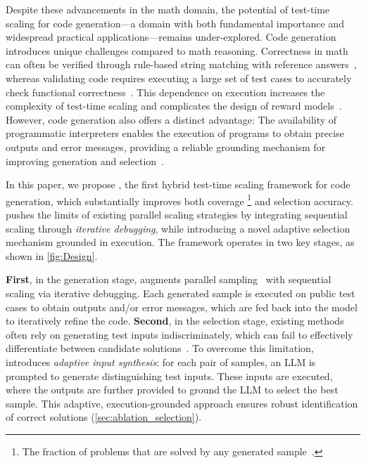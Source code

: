 Despite these advancements in the math domain, the potential of test-time scaling for code generation---a domain with both fundamental importance and widespread practical applications---remains under-explored. Code generation introduces unique challenges compared to math reasoning. Correctness in math can often be verified through rule-based string matching with reference answers~\citep{guo2025deepseek, AceCoder}, whereas validating code requires executing a large set of test cases to accurately check functional correctness~\citep{liu2023your}. This dependence on execution increases the complexity of test-time scaling and complicates the design of reward models~\citep{AceCoder}. However, code generation also offers a distinct advantage: The availability of programmatic interpreters enables the execution of programs to obtain precise outputs and error messages, providing a reliable grounding mechanism for improving generation and selection~\citep{chen2023teaching, li2022competition}.



In this paper, we propose \frameworkname, the first hybrid test-time scaling framework for code generation, which substantially improves both coverage \footnote{The fraction of problems that are solved by any generated
sample~\citep{brown2024large}.} and selection accuracy. \frameworkname pushes the limits of existing parallel scaling strategies by integrating sequential scaling through \emph{iterative debugging}, while introducing a novel adaptive selection mechanism grounded in execution. The framework operates in two key stages, as shown in \cref{fig:Design}.

\textbf{First}, in the generation stage, \frameworkname augments parallel sampling~\citep{brown2024large, li2022competition} with sequential scaling via iterative debugging. Each generated sample is executed on public test cases to obtain outputs and/or error messages, which are fed back into the model to iteratively refine the code. 
\textbf{Second}, in the selection stage, existing methods often rely on generating test inputs indiscriminately, which can fail to effectively differentiate between candidate solutions~\citep{chen2022codet, AceCoder}. To overcome this limitation, \frameworkname introduces \textit{adaptive input synthesis}: for each pair of samples, an LLM is prompted to generate distinguishing test inputs. These inputs are executed, where the outputs are further provided to ground the LLM to select the best sample.
This adaptive, execution-grounded approach ensures robust identification of correct solutions (\cref{sec:ablation_selection}).


